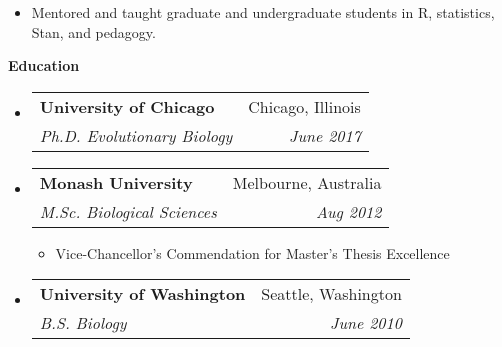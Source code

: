 \documentclass[letterpaper,11pt]{article}
\makeatletter
\newcommand{\resitem}[1]{\item #1 \vspace{-2pt}}
\newcommand{\resheading}[1]{
  {\large \colorbox{mygrey}{\begin{minipage}{\textwidth}{\textbf{#1 \vphantom{p\^{E}}}}\end{minipage}}}
}
\newcommand{\ressubheading}[4]{
  \begin{tabular*}{6.5in}{l@{\extracolsep{\fill}}r}
    \textbf{#1} & #2 \\
    \textit{#3} & \textit{#4} \\
\end{tabular*}\vspace{-6pt}}
\makeatother
\begin{document}
\begin{itemize}
{\begin{itemize}
          \resitem{Mentored and taught graduate and undergraduate students in R, statistics, Stan, and pedagogy.}
      \end{itemize}
    }
\end{itemize}  %



%


\resheading{Education}
\begin{itemize}
  \item
    \ressubheading{University of Chicago}{Chicago, Illinois}{Ph.D. Evolutionary Biology}{June 2017}
  \item
    \ressubheading{Monash University}{Melbourne, Australia}{M.Sc. Biological Sciences}{Aug 2012}
    \begin{itemize}
      \item {\footnotesize Vice-Chancellor's Commendation for Master's Thesis Excellence}
    \end{itemize}
  \item
    \ressubheading{University of Washington}{Seattle, Washington}{B.S. Biology}{June 2010}
\end{itemize} %



\end{document}
